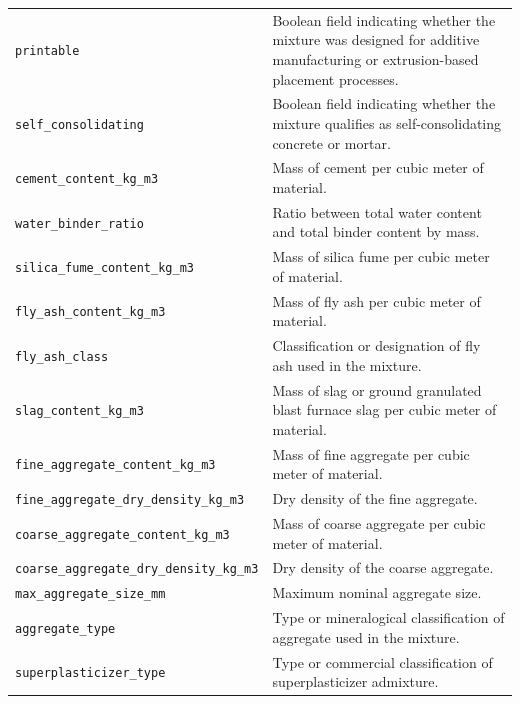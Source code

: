 \documentclass[11pt]{book}
\begin{document}
{\begin{longtable}{p{}p{}}
\texttt{printable} &
Boolean field indicating whether the mixture was designed for additive manufacturing or extrusion-based placement processes. \\

\texttt{self\_consolidating} &
Boolean field indicating whether the mixture qualifies as self-consolidating concrete or mortar. \\

\texttt{cement\_content\_kg\_m3} &
Mass of cement per cubic meter of material. \\

\texttt{water\_binder\_ratio} &
Ratio between total water content and total binder content by mass. \\

\texttt{silica\_fume\_content\_kg\_m3} &
Mass of silica fume per cubic meter of material. \\

\texttt{fly\_ash\_content\_kg\_m3} &
Mass of fly ash per cubic meter of material. \\

\texttt{fly\_ash\_class} &
Classification or designation of fly ash used in the mixture. \\

\texttt{slag\_content\_kg\_m3} &
Mass of slag or ground granulated blast furnace slag per cubic meter of material. \\

\texttt{fine\_aggregate\_content\_kg\_m3} &
Mass of fine aggregate per cubic meter of material. \\

\texttt{fine\_aggregate\_dry\_density\_kg\_m3} &
Dry density of the fine aggregate. \\

\texttt{coarse\_aggregate\_content\_kg\_m3} &
Mass of coarse aggregate per cubic meter of material. \\

\texttt{coarse\_aggregate\_dry\_density\_kg\_m3} &
Dry density of the coarse aggregate. \\

\texttt{max\_aggregate\_size\_mm} &
Maximum nominal aggregate size. \\

\texttt{aggregate\_type} &
Type or mineralogical classification of aggregate used in the mixture. \\

\texttt{superplasticizer\_type} &
Type or commercial classification of superplasticizer admixture. \\


\end{longtable}}
\end{document}
